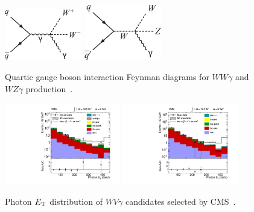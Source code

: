 \begin{figure}[p]
    \centering
    \includegraphics[width=0.3\textwidth]{figures/ss-inclboson-triboson-wvg-diagram1.pdf}
    \includegraphics[width=0.3\textwidth]{figures/ss-inclboson-triboson-wvg-diagram2.pdf}
    \caption{Quartic gauge boson interaction Feynman diagrams for $WW\gamma$ and $WZ\gamma$ production~\cite{Chatrchyan:2014bza}.}
    \label{fig:ss-inclboson-triboson-wvg-diagrams}
\end{figure}


\begin{figure}[p]
    \centering
    \includegraphics[width=0.45\textwidth]{figures/ss-inclboson-triboson-wvg-ele-cms8tev.pdf}
    \includegraphics[width=0.45\textwidth]{figures/ss-inclboson-triboson-wvg-mu-cms8tev.pdf}
    \caption{Photon $E_{\mathrm{T}}$ distribution of $WV\gamma$ candidates selected by CMS~\cite{Chatrchyan:2014bza}.}
    \label{fig:ss-inclboson-triboson-wvg-cms8tev}
\end{figure}
